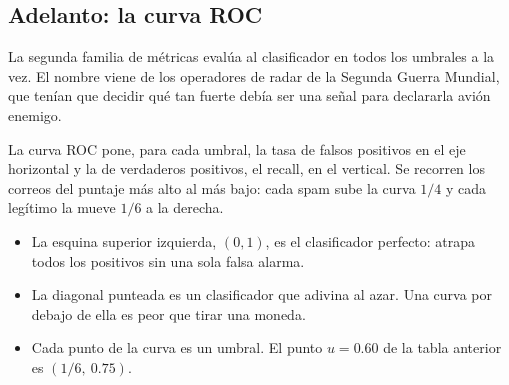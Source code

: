 \documentclass[11pt,letterpaper]{article}
\begin{document}

\subsection*{Adelanto: la curva ROC}

La segunda familia de métricas evalúa al clasificador en todos los
umbrales a la vez. El nombre viene de los operadores de radar de la
Segunda Guerra Mundial, que tenían que decidir qué tan fuerte debía
ser una señal para declararla avión enemigo.

La curva ROC pone, para cada umbral, la tasa de falsos positivos en el
eje horizontal y la de verdaderos positivos, el recall, en el
vertical. Se recorren los correos del puntaje más alto al más bajo:
cada spam sube la curva $1/4$ y cada legítimo la mueve $1/6$ a la
derecha.

\begin{center}
\end{center}

\begin{itemize}[itemsep=0.3em]
    \item La esquina superior izquierda, $(0, 1)$, es el clasificador
          perfecto: atrapa todos los positivos sin una sola falsa
          alarma.
    \item La diagonal punteada es un clasificador que adivina al azar.
          Una curva por debajo de ella es peor que tirar una moneda.
    \item Cada punto de la curva es un umbral. El punto $u = 0.60$ de
          la tabla anterior es $(1/6,\ 0.75)$.
\end{itemize}
\end{document}
